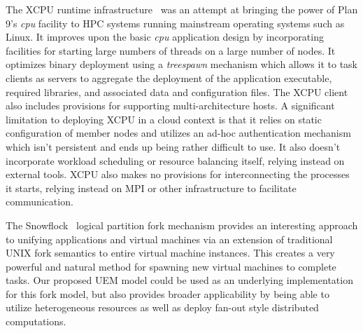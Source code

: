 \documentclass{sig-alternate}
\begin{document}
The XCPU runtime infrastructure~\cite{lucho-xcpu} was an attempt at bringing
the power of Plan 9's \emph{cpu} facility to HPC systems running
mainstream operating systems such as Linux.   
It improves upon the basic \emph{cpu} application design 
by incorporating facilities for starting large numbers of threads on a large 
number of nodes.  It optimizes binary deployment using a {\it treespawn} 
mechanism which allows it to task clients as servers to aggregate the deployment
of the application executable, required libraries, and associated data and 
configuration files.  
The XCPU client also includes provisions for supporting multi-architecture
hosts.
A significant limitation to deploying XCPU in a cloud context is that it
relies on static configuration of member nodes and utilizes an
ad-hoc authentication mechanism which isn't persistent and ends up being
rather difficult to use.
It also doesn't incorporate workload scheduling or resource balancing itself, 
relying instead on external tools.
XCPU also makes no provisions for interconnecting the processes it starts,
relying instead on MPI or other infrastructure to facilitate communication.

The Snowflock~\cite{Cavilla:snowflock} logical partition fork mechanism provides 
an interesting approach to unifying applications and virtual machines via an 
extension of traditional UNIX fork semantics to entire virtual machine 
instances.  This creates a very powerful and natural method for spawning new
virtual machines to complete tasks.  
Our proposed UEM model could be used as an underlying implementation for this
fork model, but also provides broader applicability by being able to
utilize heterogeneous resources as well as deploy fan-out style distributed
computations.
\end{document}
